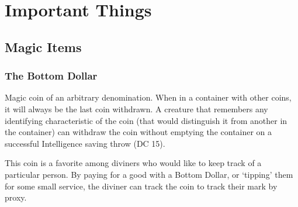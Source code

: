 \documentclass{report}
\newif\ifdm
\let\stdsection\section
\renewcommand{\section}{\clearpage\stdsection}
\newcommand{\dmonly}[1]{\ifdm{\color{blue}\hrulefill\par\textit{DM Only} #1\par\hrulefill}\else{}\fi}
\begin{document}
  \dmonly{{\LARGE
    This is the DM copy.
    If you're a player, this will have spoilers.
  }}


  \tableofcontents

  
  
  
  
  

\chapter{Important Things}
\section{Magic Items}
\subsection{The Bottom Dollar}
Magic coin of an arbitrary denomination.
When in a container with other coins, it will always be the last coin withdrawn.
A creature that remembers any identifying characteristic of the coin
  (that would distinguish it from another in the container) can withdraw the coin without emptying
  the container on a successful Intelligence saving throw (DC 15).

This coin is a favorite among diviners who would like to keep track of a particular person.
By paying for a good with a Bottom Dollar, or `tipping' them for some small service, the diviner
  can track the coin to track their mark by proxy.
\end{document}
